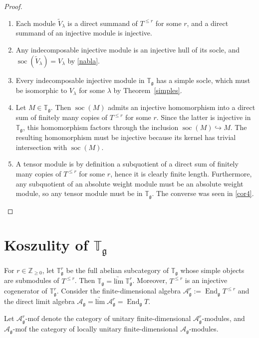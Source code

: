 \documentclass{amsart}
\newcommand{\Tg}{\mathbb T_{\mathfrak g}}
\renewcommand{\gg}{\mathfrak{g}}
\newcommand{\ZZ}{\mathbb{Z}}
\newcommand{\limarr}{\underrightarrow{\mathrm{lim}} \;}
\newcommand{\soc}{\operatorname{soc}}
\theoremstyle{definition}
\numberwithin{equation}{section}
\begin{document}
\begin{proof}
\begin{enumerate}
\item Each module $\tilde V_\lambda$ is a direct summand of $T^{\leq r}$ for some $r$, and a direct summand of an injective module is injective.
\item Any indecomposable injective module is an injective hull of its socle, and $\soc(\tilde{V}_\lambda) = V_\lambda$ by \eqref{nabla}.
\item Every indecomposable injective module in $\Tg$ has a simple socle, which must be isomorphic to $V_\lambda$ for some $\lambda$ by Theorem~\ref{simples}.
\item Let $M \in \Tg$.  Then $\soc(M)$ admits an injective homomorphism into a direct sum of finitely many copies of $T^{\leq r}$ for some $r$.  Since the latter is injective in $\Tg$, this homomorphism factors through the inclusion $\soc(M) \hookrightarrow M$.  The resulting homomorphism must be injective because its kernel has trivial intersection with $\soc(M)$.
\item A tensor module is by definition a subquotient of a direct sum of finitely many copies of $T^{\leq r}$ for some $r$, hence it is clearly finite length.  Furthermore, any subquotient of an absolute weight module must be an absolute weight module, so any tensor module must be in $\Tg$.  The converse was seen in \eqref{cor4}. 
\end{enumerate}
\end{proof}



\section{Koszulity of $\Tg$}

For $r \in \ZZ_{\geq 0}$, let $\Tg^r$ be the full abelian subcategory of $\Tg$ whose simple
objects are submodules of $T^{\leq r}$. 
Then $\Tg=\limarr \Tg^r$. Moreover, $T^{\leq r}$ is an injective
cogenerator of $\Tg^r$. 
Consider the finite-dimensional algebra
$\mathcal{A}_\gg^r:=\operatorname{End}_\gg T^{\leq r}$ and 
the direct limit algebra $\mathcal{A}_\gg=\limarr \mathcal{A}_\gg^{r} = \operatorname{End}_\gg T$.

Let $\mathcal{A}_\gg^r$-$\mathrm{mof}$ denote the category of unitary finite-dimensional $\mathcal{A}_\gg^r$-modules, and
$\mathcal{A}_\gg$-$\mathrm{mof}$ the category of locally unitary finite-dimensional $\mathcal{A}_\gg$-modules.
\end{document}
